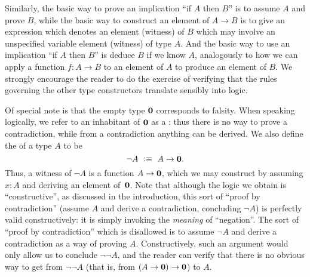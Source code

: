 Similarly, the basic way to prove an implication ``if $A$ then $B$'' is to assume $A$ and prove $B$, while the basic way to construct an element of $A\to B$ is to give an expression which denotes an element (witness) of $B$ which may involve an unspecified variable element (witness) of type $A$.
And the basic way to use an implication ``if $A$ then $B$'' is deduce $B$ if we know $A$, analogously to how we can apply a function $f:A\to B$ to an element of $A$ to produce an element of $B$.
We strongly encourage the reader to do the exercise of verifying that the rules governing the other type constructors translate sensibly into logic.

Of special note is that the empty type $\mathbf{0}$ corresponds to falsity.
When speaking logically, we refer to an inhabitant of $\mathbf{0}$ as a :
%
thus there is no way to prove a contradiction, while from a contradiction anything can be derived.
We also define the 
%
of a type $A$ to be
%
\begin{equation*}
  \neg A \ \vcentcolon\equiv\ A \to \mathbf{0}.
\end{equation*}
%
Thus, a witness of $\neg A$ is a function $A \to \mathbf{0}$, which we may construct by assuming $x : A$ and deriving an element of~$\mathbf{0}$.
%
Note that although the logic we obtain is ``constructive'', as discussed in the introduction, this sort of ``proof by contradiction'' (assume $A$ and derive a contradiction, concluding $\neg A$) is perfectly valid constructively: it is simply invoking the \emph{meaning} of ``negation''.
The sort of ``proof by contradiction'' which is disallowed is to assume $\neg A$ and derive a contradiction as a way of proving $A$.
Constructively, such an argument would only allow us to conclude $\neg\neg A$, and the reader can verify that there is no obvious way to get from $\neg\neg A$ (that is, from $(A\to \mathbf{0})\to\mathbf{0}$) to $A$.

\mentalpause

